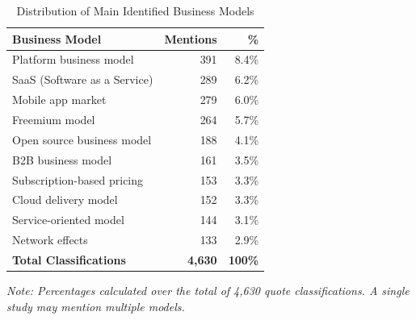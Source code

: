 \begin{table}[!htb]
\renewcommand{\arraystretch}{1.3}
\caption{Distribution of Main Identified Business Models}
\label{tab:business-models-distribution}
\centering
\small
\begin{tabular}{l|r|r}
\bottomrule
\textbf{Business Model} & \textbf{Mentions} & \textbf{\%} \\
\hline
Platform business model & 391 & 8.4\% \\
SaaS (Software as a Service) & 289 & 6.2\% \\
Mobile app market & 279 & 6.0\% \\
Freemium model & 264 & 5.7\% \\
Open source business model & 188 & 4.1\% \\
B2B business model & 161 & 3.5\% \\
Subscription-based pricing & 153 & 3.3\% \\
Cloud delivery model & 152 & 3.3\% \\
Service-oriented model & 144 & 3.1\% \\
Network effects & 133 & 2.9\% \\
\rowcolor{gray!50}
\textbf{Total Classifications} & \textbf{4,630} & \textbf{100\%} \\
\toprule
\end{tabular}
\vspace{0.2cm}

\footnotesize\textit{Note: Percentages calculated over the total of 4,630 quote classifications. A single study may mention multiple models.}
\end{table}

